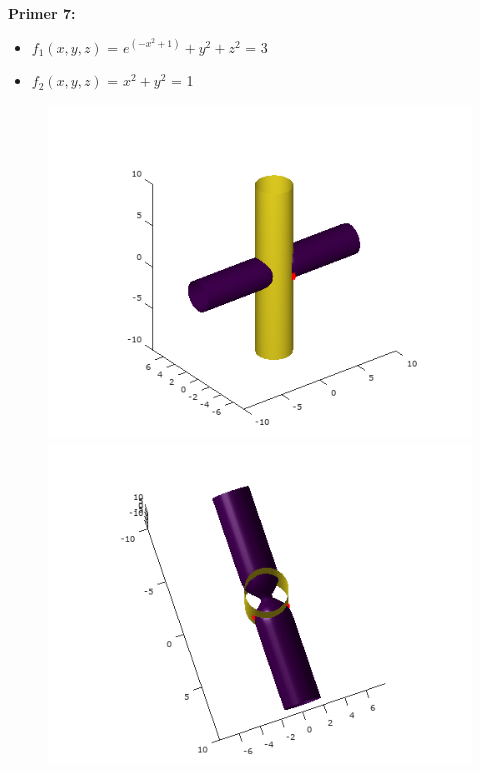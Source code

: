 \documentclass[12pt]{article}
\begin{document}
	\begin{minipage}{\textwidth}
		\textbf{\large{Primer 7:}}
		\begin{itemize}  
			\item $f_{1}(x,y,z)$ = $e^{(-x^{2}+1)}+y^{2}+z^{2}$ = 3
			\item $f_{2}(x,y,z)$ =  $x^2 + y^2$ = 1
		\end{itemize}
		\begin{figure}[H]
			\centering
			\includegraphics[scale=0.47]{primer7_1}
			\includegraphics[scale=0.47]{primer7_2}

\end{figure}
\end{minipage}
\end{document}
